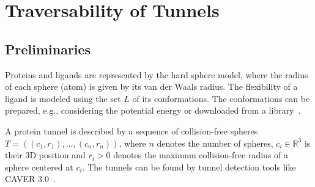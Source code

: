 \documentclass{svmult}
\def\R{\mathbb{R}}
\def\L{L}
\begin{document}
\section{Traversability of Tunnels}

\subsection{Preliminaries}

Proteins and ligands are represented by the hard sphere model, where the radius of each sphere (atom) is given by its van der Waals radius.
The flexibility of a ligand is modeled using the set $\L$ of its conformations.
The conformations can be prepared, e.g., considering the potential energy or downloaded from a library~\cite{dunbrack}.


A protein tunnel is described by a sequence of collision-free spheres 
$T=( (c_1, r_1),\ldots,(c_n,r_n) )$, where $n$ denotes the number of spheres,
$c_i \in \R^3$ is their 3D position and $r_i > 0$ denotes the maximum collision-free radius of a sphere centered at $c_i$. 
The tunnels can be found by tunnel detection tools like CAVER 3.0~\cite{caver3}.


\end{document}
